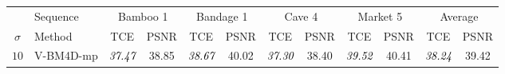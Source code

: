 \documentclass[10pt, journal, twocolumn, final, a4paper]{IEEEtran}
\newcommand{\bsic}[1]{\textcolor{black}{\textit{#1}}}
\newcommand{\Bsic}[1]{\textcolor{black}{\textbf{\textit{#1}}}}
\newcommand{\Best}[1]{\textbf{\textcolor{black}{#1}}}
\begin{document}
\begin{table}[htp!]
\begin{center}
{%
		\begin{tabular}{ c | l |c c | c c | c c | c c | c c}
			\hline
			\rule{0pt}{10pt}         & Sequence          &\multicolumn{2}{c|}{Bamboo 1}&\multicolumn{2}{c|}{Bandage 1}&\multicolumn{2}{c|}{Cave 4} &\multicolumn{2}{c|}{Market 5}& \multicolumn{2}{c}{Average} \\
			\rule{0pt}{10pt}$\sigma$ & Method            & TCE          & PSNR         & TCE          & PSNR         & TCE          & PSNR         & TCE          & PSNR         & TCE          & PSNR         \\\hline
			\multirow{1}{*}{$10$}
			                      & V-BM4D-mp            & \bsic{37.47} &       38.85  & \bsic{38.67} &       40.02  & \bsic{37.30} &       38.40  & \bsic{39.52} &       40.41  & \bsic{38.24} &       39.42  \\

\end{tabular}}
\end{center}
\end{table}
\end{document}
